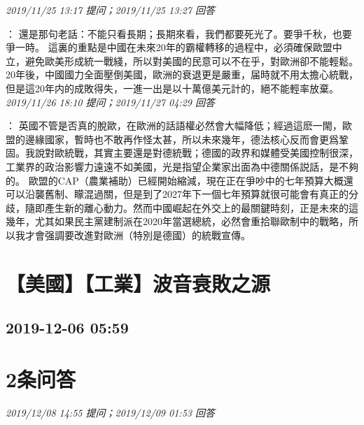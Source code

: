 \documentclass[twocolumn]{ctexart}
\begin{document}
\textit{\hfill\noindent\small 2019/11/25 13:17 提问；2019/11/25 13:27 回答}

：
還是那句老話：不能只看長期；長期來看，我們都要死光了。要爭千秋，也要爭一時。 
這裏的重點是中國在未來20年的霸權轉移的過程中，必須確保歐盟中立，避免歐美形成統一戰綫，所以對美國的民意可以不在乎，對歐洲卻不能輕鬆。 
20年後，中國國力全面壓倒美國，歐洲的衰退更是嚴重，届時就不用太擔心統戰，但是這20年内的成敗得失，一進一出是以十萬億美元計的，絕不能輕率放棄。
\\

\textit{\hfill\noindent\small 2019/11/26 18:10 提问；2019/11/27 04:29 回答}

：
英國不管是否真的脫歐，在歐洲的話語權必然會大幅降低；經過這麽一閙，歐盟的邊緣國家，暫時也不敢再作怪太甚，所以未來幾年，德法核心反而會更爲鞏固。我說對歐統戰，其實主要還是對德統戰；德國的政界和媒體受美國控制很深，工業界的政治影響力遠遠不如美國，光是指望企業家出面為中德關係説話，是不夠的。 
歐盟的CAP（農業補助）已經開始縮減，現在正在爭吵中的七年預算大概還可以沿襲舊制、矇混過關，但是到了2027年下一個七年預算就很可能會有真正的分歧，隨即產生新的離心動力。然而中國崛起在外交上的最關鍵時刻，正是未來的這幾年，尤其如果民主黨建制派在2020年當選總統，必然會重拾聯歐制中的戰略，所以我才會强調要改進對歐洲（特別是德國）的統戰宣傳。
\\


\section{【美國】【工業】波音衰敗之源}
\subsection{2019-12-06 05:59}


\section{2条问答}

\textit{\hfill\noindent\small 2019/12/08 14:55 提问；2019/12/09 01:53 回答}
\end{document}
